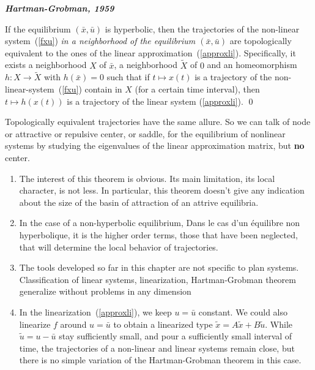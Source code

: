 \begin{theoreme} {\bf{\em Hartman-Grobman, 1959}}

If the equilibrium $(\bar x,\bar u)$ is hyperbolic, then the trajectories of the non-linear system~(\ref{fxu})
{\em in a neighborhood of the equilibrium $(\bar x,\bar u)$} are topologically equivalent to the ones of the linear approximation~(\ref{approxli}). Specifically, it exists a neighborhood $X$ of $\bar x$, a neighborhood $\tilde{X}$ of $0$ and an homeomorphism $h: X \to \tilde{X}$ with $h(\bar x)=0$
such that if $t \mapsto x(t)$ is a trajectory of the non-linear-system~(\ref{fxu}) contain in $X$ (for a certain time interval), then $t \mapsto h(x(t))$ is a trajectory of the linear system (\ref{approxli}). \label{Hart}\qed
\end{theoreme}

Topologically equivalent trajectories have the same allure. So we can talk of node or attractive or repulsive center, or saddle, for the equilibrium of nonlinear systems by studying the eigenvalues of the linear approximation matrix, but {\bf no} center.

\begin{remarques}\hspace{10mm}\end{remarques}

\begin{enumerate}
\item The interest of this theorem is obvious. Its main limitation, its local character, is not less. In particular, this theorem doesn't give any indication about the size of the basin of attraction of an attrive equilibria.
\item In the case of a non-hyperbolic equilibrium, Dans le cas d'un {é}quilibre non hyperbolique, it is the higher order terms, those that have been neglected, that will determine the local behavior of trajectories.
\item The tools developed so far in this chapter are not specific to plan systems. Classification of linear systems, linearization, Hartman-Grobman theorem generalize without problems in any dimension
\item In the linearization~(\ref{approxli}), we keep $u=\bar u$ constant. We could also linearize $f$ around $u=\bar u$ to obtain a linearized type $\tilde{x}=A\tilde{x} + B\tilde{u}$. While $\tilde{u}=u-\bar u$ stay sufficiently small, and pour a sufficiently small interval of time, the trajectories of a non-linear and linear systems remain close, but there is no simple variation of the Hartman-Grobman theorem in this case.
\cqfd
\end{enumerate}



